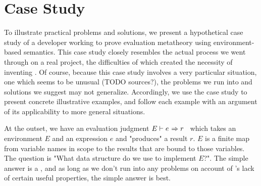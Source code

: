 \section{Case Study}
\label{sec:CaseStudy}


{\color{gray}

To illustrate practical problems and solutions, we present a hypothetical case study of a developer working to
prove evaluation metatheory using environment-based semantics. This case study closely resembles the actual process we went
through on a real project, the difficulties of which created the necessity of inventing \dds. Of course,
because this case study involves a very particular situation, one which seems to be unusual (TODO sources?),
the problems we run into and solutions we suggest may not generalize. Accordingly, we use the case study to
present concrete illustrative examples, and follow each example with an argument of its applicability to more
general situations.

\newcommand{\eval}[3]{\ensuremath{{#1} \vdash {#2} \hspace{0.01in} \Rightarrow {#3}}}

At the outset, we have an evaluation judgment \eval{E}{e}{r}~ which takes an environment $E$ and an expression $e$
and "produces" a result $r$.
$E$ is a finite map from variable names in scope to the results that are bound to
those variables. The question is "What data structure do we use to implement $E$?". The simple answer is a \sal,
and as long as we don't run into any problems on account of \SAL's lack of certain useful properties, the simple
answer is best.

}
